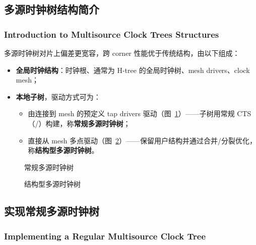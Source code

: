 \subsection{多源时钟树结构简介}
\subsubsection*{Introduction to Multisource Clock Trees Structures}

多源时钟树对片上偏差更宽容，跨 corner 性能优于传统结构，由以下组成：
\begin{itemize}
  \item \textbf{全局时钟结构}：时钟根、通常为 H-tree 的全局时钟树、mesh drivers、clock mesh；
  \item \textbf{本地子树}，驱动方式可为：
        \begin{itemize}
          \item 由连接到 mesh 的预定义 tap drivers 驱动（图~\ref{fig:mscts-reg}）——子树用常规 CTS（/）构建，称\textbf{常规多源时钟树}；
          \item 直接从 mesh 多点驱动（图~\ref{fig:mscts-str}）——保留用户结构并通过合并/分裂优化，称\textbf{结构型多源时钟树}。
        \end{itemize}
\end{itemize}

\begin{figure}[htbp]
\centering
{}
\caption{常规多源时钟树}
\label{fig:mscts-reg}
\end{figure}

\begin{figure}[htbp]
\centering
{}
\caption{结构型多源时钟树}
\label{fig:mscts-str}
\end{figure}

\subsection{实现常规多源时钟树}
\subsubsection*{Implementing a Regular Multisource Clock Tree}

